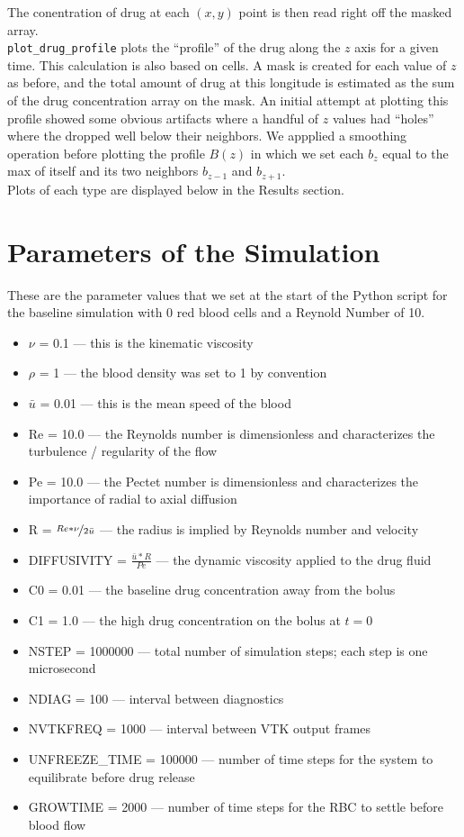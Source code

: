 \documentclass[11pt]{article} %
\newcommand{\tty}[1]{\texttt{#1}}
\begin{document}
The conentration of drug at each $(x, y)$ point is then read right off the masked array.\\
\tty{plot\_drug\_profile} plots the ``profile'' of the drug along the $z$ axis for a given time.
This calculation is also based on cells.  
A mask is created for each value of $z$ as before, and the total amount of drug 
at this longitude is estimated as the sum of the drug concentration array on the mask.
An initial attempt at plotting this profile showed some obvious artifacts where 
a handful of $z$ values had ``holes'' where the dropped well below their neighbors.
We appplied a smoothing operation before plotting the profile $B(z)$ in which 
we set each $b_z$ equal to the max of itself and its two neighbors $b_{z-1}$ and $b_{z+1}$.\\
Plots of each type are displayed below in the Results section.

\newpage

\section{Parameters of the Simulation}
These are the parameter values that we set at the start of the Python script for the baseline simulation
with 0 red blood cells and a Reynold Number of 10.
\begin{itemize}
\item $\nu$ = 0.1 --- this is the kinematic viscosity
\item $\rho$ = 1 --- the blood density was set to 1 by convention
\item $\bar{u}$ = 0.01 --- this is the mean speed of the blood
\item Re = 10.0 --- the Reynolds number is dimensionless and characterizes the turbulence / regularity of the flow
\item Pe = 10.0 --- the Pectet number is dimensionless and characterizes the importance of radial to axial diffusion
\item R = $\nicefrac{Re * \nu}{2  \bar{u}}$ --- the radius is implied by Reynolds number and velocity
\item DIFFUSIVITY = $\frac{\bar{u} * R}{Pe}$ --- the dynamic viscosity applied to the drug fluid
\item C0 = 0.01 --- the baseline drug concentration away from the bolus
\item C1 = 1.0 --- the high drug concentration on the bolus at $t=0$
\item NSTEP = 1000000 --- total number of simulation steps; each step is one microsecond
\item NDIAG = 100 --- interval between diagnostics
\item NVTKFREQ = 1000 --- interval between VTK output frames
\item UNFREEZE\_TIME = 100000 --- number of time steps for the system to equilibrate before drug release
\item GROWTIME = 2000 --- number of time steps for the RBC to settle before blood flow
\end{itemize}
\end{document}

